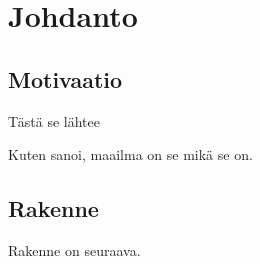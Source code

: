 \section{Johdanto}

\subsection{Motivaatio}
\par Tästä se lähtee

\par Kuten \cite{luo2003spectral} sanoi, maailma on se mikä se on.
\subsection{Rakenne}
Rakenne on seuraava.
